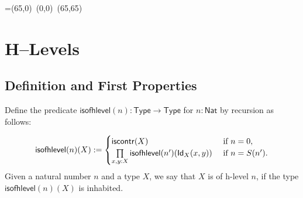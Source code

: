 


\newbox\pbbox
\setbox\pbbox=\hbox{\xy \POS(65,0)\ar@{-} (0,0) \ar@{-} (65,65)\endxy}
\def\pb{\save[]+<3.5mm,-3.5mm>*{\copy\pbbox} \restore}


\newcommand{\comp}[2]{\ensuremath{{#2} \circ {#1}}}

%
\newcommand{\contr}{\ensuremath{\mathsf{contr}}}
\newcommand{\iscontr}{\ensuremath{\mathsf{iscontr}}}
 \newcommand{\HLevel}{\mathsf{HLevel}}
 \newcommand{\hProp}{\mathsf{hProp}}
 \newcommand{\ishProp}{\mathsf{ishProp}}
 \newcommand{\isofhlevel}{\mathsf{isofhlevel}}
 \newcommand{\isweq}{\mathsf{isweq}}
 \newcommand{\Nat}{\mathsf{Nat}}
 \newcommand{\Type}{\mathsf{Type}}






\chapter{H--Levels}
\label{cha:hlevels}

\section{Definition and First Properties}

\begin{defn}\label{def:hlevel}
  Define the predicate $\isofhlevel(n) : \Type \to \Type$ for $n : \Nat$ by recursion as follows:
  
\[ \isofhlevel(n)(X) := \begin{cases}
                         \iscontr(X) & \text{ if } n = 0 , \\
                         \prod\limits_{x,y : X}\isofhlevel(n')(\idtype[X]{x}{y}) & \text{ if } n = S(n') .
                        \end{cases}
\]
%   
Given a natural number $n$ and a type $X$, we say that $X$ is of h-level $n$, if the type $\isofhlevel(n)(X)$ is inhabited.
\end{defn}

